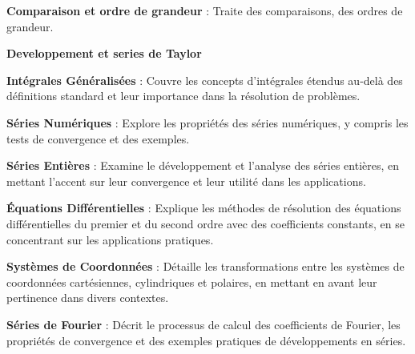  \label{ch:Quick Summary}

\vspace{2ex} %

\textbf{Comparaison et ordre de grandeur } : Traite des comparaisons, des ordres de grandeur.

\textbf{Developpement et series de Taylor }

\textbf{Intégrales Généralisées } : Couvre les concepts d’intégrales étendus au-delà des définitions standard et leur importance dans la résolution de problèmes.

\textbf{Séries Numériques } : Explore les propriétés des séries numériques, y compris les tests de convergence et des exemples.

\textbf{Séries Entières } : Examine le développement et l’analyse des séries entières, en mettant l’accent sur leur convergence et leur utilité dans les applications.

\textbf{Équations Différentielles } : Explique les méthodes de résolution des équations différentielles du premier et du second ordre avec des coefficients constants, en se concentrant sur les applications pratiques.

\textbf{Systèmes de Coordonnées } : Détaille les transformations entre les systèmes de coordonnées cartésiennes, cylindriques et polaires, en mettant en avant leur pertinence dans divers contextes.

\textbf{Séries de Fourier } : Décrit le processus de calcul des coefficients de Fourier, les propriétés de convergence et des exemples pratiques de développements en séries.
